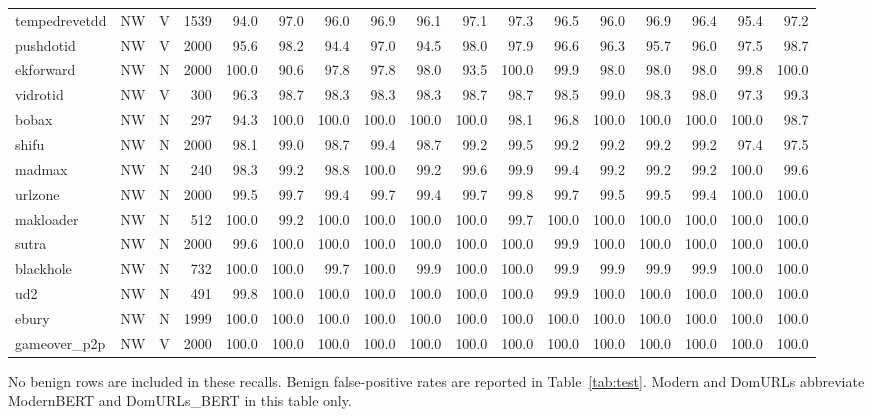 \begin{table}[!t]
\begin{tabular}{@{}lccrrrrrrrrrrrrrr@{}}
tempedrevetdd & NW & V & 1539 & 94.0 & 97.0 & 96.0 & 96.9 & 96.1 & 97.1 & 97.3 & 96.5 & 96.0 & 96.9 & 96.4 & 95.4 & 97.2 \\
pushdotid & NW & V & 2000 & 95.6 & 98.2 & 94.4 & 97.0 & 94.5 & 98.0 & 97.9 & 96.6 & 96.3 & 95.7 & 96.0 & 97.5 & 98.7 \\
ekforward & NW & N & 2000 & 100.0 & 90.6 & 97.8 & 97.8 & 98.0 & 93.5 & 100.0 & 99.9 & 98.0 & 98.0 & 98.0 & 99.8 & 100.0 \\
vidrotid & NW & V & 300 & 96.3 & 98.7 & 98.3 & 98.3 & 98.3 & 98.7 & 98.7 & 98.5 & 99.0 & 98.3 & 98.0 & 97.3 & 99.3 \\
bobax & NW & N & 297 & 94.3 & 100.0 & 100.0 & 100.0 & 100.0 & 100.0 & 98.1 & 96.8 & 100.0 & 100.0 & 100.0 & 100.0 & 98.7 \\
shifu & NW & N & 2000 & 98.1 & 99.0 & 98.7 & 99.4 & 98.7 & 99.2 & 99.5 & 99.2 & 99.2 & 99.2 & 99.2 & 97.4 & 97.5 \\
madmax & NW & N & 240 & 98.3 & 99.2 & 98.8 & 100.0 & 99.2 & 99.6 & 99.9 & 99.4 & 99.2 & 99.2 & 99.2 & 100.0 & 99.6 \\
urlzone & NW & N & 2000 & 99.5 & 99.7 & 99.4 & 99.7 & 99.4 & 99.7 & 99.8 & 99.7 & 99.5 & 99.5 & 99.4 & 100.0 & 100.0 \\
makloader & NW & N & 512 & 100.0 & 99.2 & 100.0 & 100.0 & 100.0 & 100.0 & 99.7 & 100.0 & 100.0 & 100.0 & 100.0 & 100.0 & 100.0 \\
sutra & NW & N & 2000 & 99.6 & 100.0 & 100.0 & 100.0 & 100.0 & 100.0 & 100.0 & 99.9 & 100.0 & 100.0 & 100.0 & 100.0 & 100.0 \\
blackhole & NW & N & 732 & 100.0 & 100.0 & 99.7 & 100.0 & 99.9 & 100.0 & 100.0 & 99.9 & 99.9 & 99.9 & 99.9 & 100.0 & 100.0 \\
ud2 & NW & N & 491 & 99.8 & 100.0 & 100.0 & 100.0 & 100.0 & 100.0 & 100.0 & 99.9 & 100.0 & 100.0 & 100.0 & 100.0 & 100.0 \\
ebury & NW & N & 1999 & 100.0 & 100.0 & 100.0 & 100.0 & 100.0 & 100.0 & 100.0 & 100.0 & 100.0 & 100.0 & 100.0 & 100.0 & 100.0 \\
gameover\_p2p & NW & V & 2000 & 100.0 & 100.0 & 100.0 & 100.0 & 100.0 & 100.0 & 100.0 & 100.0 & 100.0 & 100.0 & 100.0 & 100.0 & 100.0 \\
\bottomrule
\end{tabular}
\par\smallskip\begin{minipage}{\linewidth}\scriptsize No benign rows are included in these recalls. Benign false-positive rates are reported in Table~\ref{tab:test}. Modern and DomURLs abbreviate ModernBERT and DomURLs\_BERT in this table only.\end{minipage}
\end{table}
